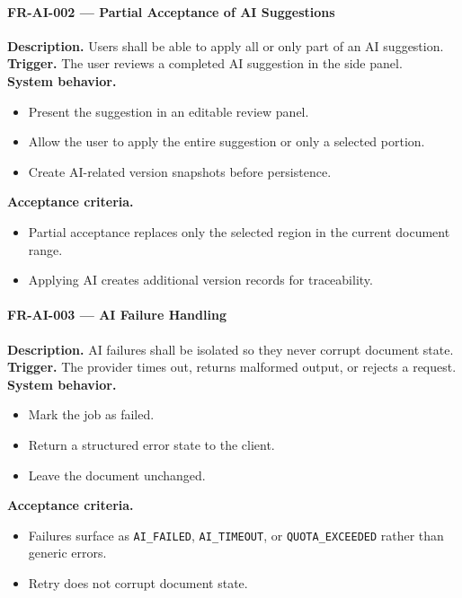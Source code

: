 \paragraph{FR-AI-002 --- Partial Acceptance of AI Suggestions}
\textbf{Description.} Users shall be able to apply all or only part of an AI suggestion.\\
\textbf{Trigger.} The user reviews a completed AI suggestion in the side panel.\\
\textbf{System behavior.}
\begin{itemize}
  \item Present the suggestion in an editable review panel.
  \item Allow the user to apply the entire suggestion or only a selected portion.
  \item Create AI-related version snapshots before persistence.
\end{itemize}
\textbf{Acceptance criteria.}
\begin{itemize}
  \item Partial acceptance replaces only the selected region in the current document range.
  \item Applying AI creates additional version records for traceability.
\end{itemize}

\paragraph{FR-AI-003 --- AI Failure Handling}
\textbf{Description.} AI failures shall be isolated so they never corrupt document state.\\
\textbf{Trigger.} The provider times out, returns malformed output, or rejects a request.\\
\textbf{System behavior.}
\begin{itemize}
  \item Mark the job as failed.
  \item Return a structured error state to the client.
  \item Leave the document unchanged.
\end{itemize}
\textbf{Acceptance criteria.}
\begin{itemize}
  \item Failures surface as \texttt{AI\_FAILED}, \texttt{AI\_TIMEOUT}, or \texttt{QUOTA\_EXCEEDED} rather than generic errors.
  \item Retry does not corrupt document state.
\end{itemize}

